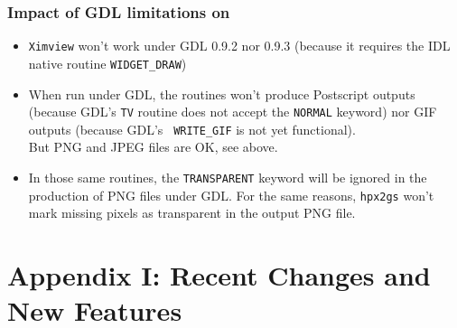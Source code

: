 \documentclass[12pt,twoside]{article}
\begin{document}
\subsubsection*{Impact of GDL limitations on \healpix}
\begin{itemize}
\item {\tt Ximview} won't work under GDL 0.9.2 nor 0.9.3 (because it requires the
IDL native routine {\tt WIDGET\_DRAW})
\item When run under GDL, the 
routines won't produce Postscript outputs (because GDL's {\tt TV} routine does
not accept the {\tt NORMAL} keyword) nor GIF outputs (because GDL's {\tt
WRITE\_GIF} is not yet functional). \\
But PNG and JPEG files are OK, see above.
\item In those same routines, the {\tt TRANSPARENT} keyword will be ignored in the
production of PNG files under GDL. For the same reasons, {\tt hpx2gs} won't mark missing pixels as
transparent in the output PNG file.
\end{itemize}


\vfill\newpage
\section{Appendix I: Recent Changes and New Features}
\label{sec:newfeatures}
\end{document}
